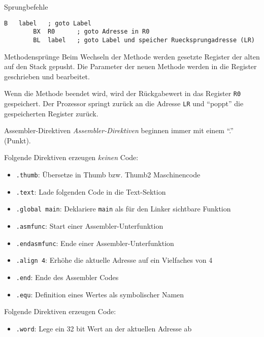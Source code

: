 \begin{defi}{Sprungbefehle}
    \begin{lstlisting}[language={[x86masm]Assembler}]
        B   label   ; goto Label
        BX  R0      ; goto Adresse in R0
        BL  label   ; goto Label und speicher Ruecksprungadresse (LR)
    \end{lstlisting}
\end{defi}

\begin{bonus}{Methodensprünge}
    Beim Wechseln der Methode werden gesetzte Register der alten auf den Stack gepusht.
    Die Parameter der neuen Methode werden in die Register geschrieben und bearbeitet.

    Wenn die Methode beendet wird, wird der Rückgabewert in das Register \texttt{R0} gespeichert.
    Der Prozessor springt zurück an die Adresse \texttt{LR} und \enquote{poppt} die gespeicherten Register zurück.
\end{bonus}

\begin{bonus}{Assembler-Direktiven}
    \emph{Assembler-Direktiven} beginnen immer mit einem \enquote{.} (Punkt).

    Folgende Direktiven erzeugen \emph{keinen} Code:
    \begin{itemize}
        \item \texttt{.thumb}: Übersetze in Thumb bzw. Thumb2 Maschinencode
        \item \texttt{.text}: Lade folgenden Code in die Text-Sektion
        \item \texttt{.global main}: Deklariere \texttt{main} als für den Linker sichtbare Funktion
        \item \texttt{.asmfunc}: Start einer Assembler-Unterfunktion
        \item \texttt{.endasmfunc}: Ende einer Assembler-Unterfunktion
        \item \texttt{.align 4}: Erhöhe die aktuelle Adresse auf ein Vielfaches von 4
        \item \texttt{.end}: Ende des Assembler Codes
        \item \texttt{.equ}: Definition eines Wertes als symbolischer Namen
    \end{itemize}

    Folgende Direktiven erzeugen Code:
    \begin{itemize}
        \item \texttt{.word}: Lege ein 32 bit Wert an der aktuellen Adresse ab
    \end{itemize}
\end{bonus}


